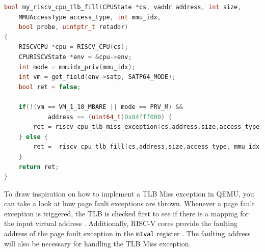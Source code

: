 \begin{lstlisting}[language=c,float=h!,
    caption={Alternative Implementation for the RISC-V tlb\_fill function with a special case to
    start testing TLB Miss Handler implementations.
    In line 11, a conditional branch is used to only trigger the exception when neither the
    Virtual Memory (as set in the \texttt{satp} \texttt{MODE} field) is bare nor the priviledge
    mode is the machine mode.
    If the virtual address is the hardcoded one, a TLB Miss exception is thrown, otherwise the
    original functions is called, which will perform a page table walk to find the mapping.},
    label={lst:specialCaseTLBfill}]
bool my_riscv_cpu_tlb_fill(CPUState *cs, vaddr address, int size,
    MMUAccessType access_type, int mmu_idx,
    bool probe, uintptr_t retaddr)
{
    RISCVCPU *cpu = RISCV_CPU(cs);
    CPURISCVState *env = &cpu->env;
    int mode = mmuidx_priv(mmu_idx);
    int vm = get_field(env->satp, SATP64_MODE);
    bool ret = false;

    if(!(vm == VM_1_10_MBARE || mode == PRV_M) &&
            address == (uint64_t)0x84fff000) {
        ret = riscv_cpu_tlb_miss_exception(cs,address,size,access_type, mmu_idx, probe, retaddr);
    } else {
        ret =  riscv_cpu_tlb_fill(cs,address,size,access_type, mmu_idx, probe, retaddr);
    }
    return ret;
}
\end{lstlisting}



To draw inspiration on how to implement a TLB Miss exception in QEMU, you can take a look at how
page fault exceptions are thrown.
Whenever a page fault exception is triggered, the TLB is checked first to see if there is a mapping
for the input virtual address \cite{QEMUSource2024}. Additionally, RISC-V cores provide the faulting
address of the page fault exception in the \texttt{mtval} register \cite{RISCVInstructionSet}.
The faulting address will also be necessary for handling the TLB Miss exception.




